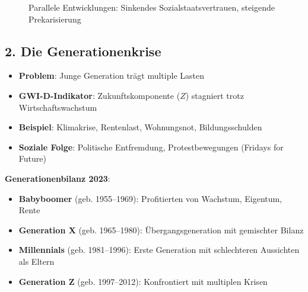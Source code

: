 \begin{figure}[ht]
    \centering
    \caption{Parallele Entwicklungen: Sinkendes Sozialstaatsvertrauen, steigende Prekarisierung}
    \label{fig:sozialstaat_vertrauen}
\end{figure}

\subsection{2. Die Generationenkrise}

\begin{itemize}
    \item \textbf{Problem}: Junge Generation trägt multiple Lasten
    \item \textbf{GWI-D-Indikator}: Zukunftskomponente (\(Z\)) stagniert trotz Wirtschaftswachstum
    \item \textbf{Beispiel}: Klimakrise, Rentenlast, Wohnungsnot, Bildungsschulden
    \item \textbf{Soziale Folge}: Politische Entfremdung, Protestbewegungen (Fridays for Future)
\end{itemize}

\textbf{Generationenbilanz 2023}:
\begin{itemize}
    \item \textbf{Babyboomer} (geb. 1955–1969): Profitierten von Wachstum, Eigentum, Rente
    \item \textbf{Generation X} (geb. 1965–1980): Übergangsgeneration mit gemischter Bilanz
    \item \textbf{Millennials} (geb. 1981–1996): Erste Generation mit schlechteren Aussichten als Eltern
    \item \textbf{Generation Z} (geb. 1997–2012): Konfrontiert mit multiplen Krisen
\end{itemize}

